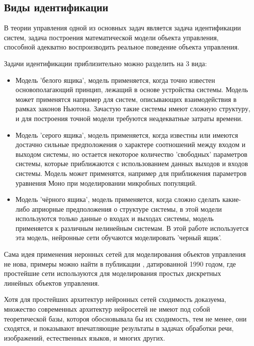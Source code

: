 \documentclass[12pt, oneside]{extbook}
\begin{document}
\begin{flushleft}
\section{Виды идентификации}
В теории управления одной из основных задач является задача идентификации систем, задача построения математической модели объекта управления, способной адекватно воспроизводить реальное поведение объекта управления.
\par
Задачи идентификации приблизительно можно разделить на 3 вида:\\
\begin{itemize}
\item Модель 'белого ящика', модель применяется, когда точно известен основополагающий принцип, лежащий в основе устройства системы. Модель может применятся например для систем, описывающих взаимодействия в рамках законов Ньютона. Зачастую такие системы имеют сложную структуру, и для построения точной модели требуются неадекватные затраты времени.
\item Модель 'серого ящика', модель применяется, когда известны или имеются достачно сильные предположения о характере соотношений между входом и выходом системы, но остается некоторое количество 'свободных' параметров системы, которые приближаются с использованием данных выходов и входов системы. Модель может применятся, например для приближения параметров уравнения Моно при моделировании микробных популяций.
\item Модель 'чёрного ящика', модель применяется, когда сложно сделать какие-либо априорные предположения о структуре системы, в этой модели используются только данные о входах и выходах системы, модель применяется к различным нелинейным системам. В этой работе используется эта модель, нейронные сети обучаются моделировать 'черный ящик'. 
\end{itemize}
\par
Сама идея применения неронных сетей для моделирования объектов управления не нова, примеры можно найти в публикации \cite{fc90}, датированной 1990 годом, где простейшие сети используются для моделирования простых дискретных линейных объектов управления.
\par 
Хотя для простейших архитектур нейронных сетей сходимость доказуема, множество современных архитектур нейросетей не имеют под собой теоретической базы, котороя обосновывала бы их сходимость, тем не менее, они сходятся, и показывают впечатляющие результаты в задачах обработки речи, изображений, естественных языков, и многих других.\\

\end{flushleft}
\end{document}
